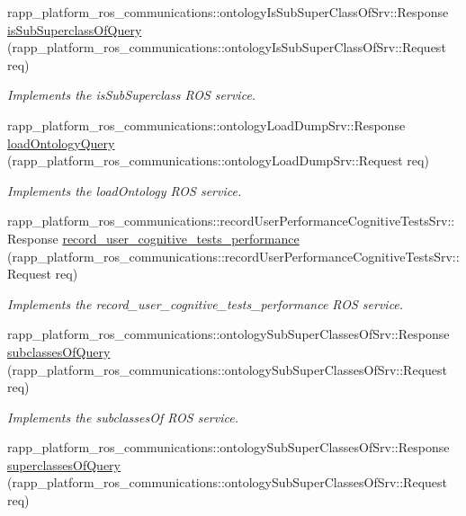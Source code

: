 \begin{DoxyCompactItemize}
rapp\-\_\-platform\-\_\-ros\-\_\-communications\-::ontology\-Is\-Sub\-Super\-Class\-Of\-Srv\-::\-Response \hyperlink{classKnowrobWrapper_a0608e1b44bdbf4925b8f3df7433e1b4d}{is\-Sub\-Superclass\-Of\-Query} (rapp\-\_\-platform\-\_\-ros\-\_\-communications\-::ontology\-Is\-Sub\-Super\-Class\-Of\-Srv\-::\-Request req)
\begin{DoxyCompactList}\small\item\em Implements the is\-Sub\-Superclass R\-O\-S service. \end{DoxyCompactList}\item 
rapp\-\_\-platform\-\_\-ros\-\_\-communications\-::ontology\-Load\-Dump\-Srv\-::\-Response \hyperlink{classKnowrobWrapper_acb503520ab8db0e11b5d6511c7d1a69b}{load\-Ontology\-Query} (rapp\-\_\-platform\-\_\-ros\-\_\-communications\-::ontology\-Load\-Dump\-Srv\-::\-Request req)
\begin{DoxyCompactList}\small\item\em Implements the load\-Ontology R\-O\-S service. \end{DoxyCompactList}\item 
rapp\-\_\-platform\-\_\-ros\-\_\-communications\-::record\-User\-Performance\-Cognitive\-Tests\-Srv\-::\-Response \hyperlink{classKnowrobWrapper_a77d7c7d52db582093065271ebb6d8be7}{record\-\_\-user\-\_\-cognitive\-\_\-tests\-\_\-performance} (rapp\-\_\-platform\-\_\-ros\-\_\-communications\-::record\-User\-Performance\-Cognitive\-Tests\-Srv\-::\-Request req)
\begin{DoxyCompactList}\small\item\em Implements the record\-\_\-user\-\_\-cognitive\-\_\-tests\-\_\-performance R\-O\-S service. \end{DoxyCompactList}\item 
rapp\-\_\-platform\-\_\-ros\-\_\-communications\-::ontology\-Sub\-Super\-Classes\-Of\-Srv\-::\-Response \hyperlink{classKnowrobWrapper_a6e2ee6a631a705466a490f37ecf8afd5}{subclasses\-Of\-Query} (rapp\-\_\-platform\-\_\-ros\-\_\-communications\-::ontology\-Sub\-Super\-Classes\-Of\-Srv\-::\-Request req)
\begin{DoxyCompactList}\small\item\em Implements the subclasses\-Of R\-O\-S service. \end{DoxyCompactList}\item 
rapp\-\_\-platform\-\_\-ros\-\_\-communications\-::ontology\-Sub\-Super\-Classes\-Of\-Srv\-::\-Response \hyperlink{classKnowrobWrapper_a5347e77b2c2bf866c91b883f7eb19e42}{superclasses\-Of\-Query} (rapp\-\_\-platform\-\_\-ros\-\_\-communications\-::ontology\-Sub\-Super\-Classes\-Of\-Srv\-::\-Request req)

\end{DoxyCompactItemize}

